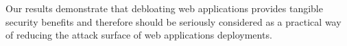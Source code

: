Our results demonstrate that debloating web applications
provides tangible security benefits and therefore should be seriously
considered as a practical way of reducing the attack surface of
web applications deployments.


